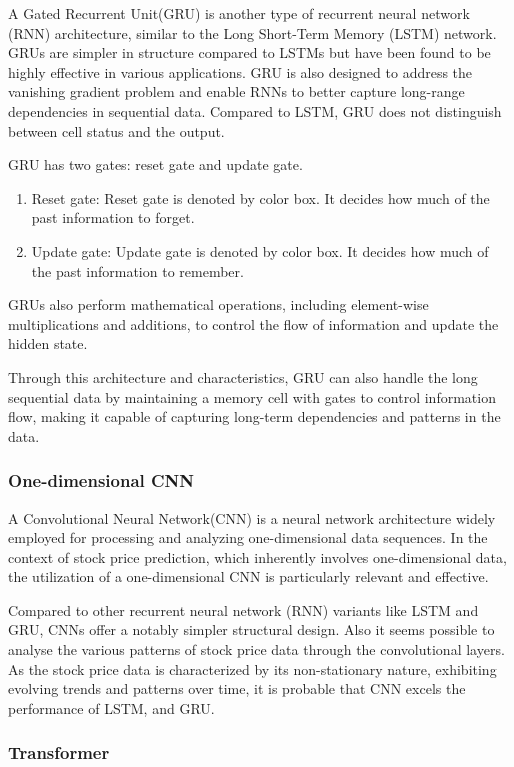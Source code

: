 A Gated Recurrent Unit(GRU) is another type of recurrent neural network (RNN) architecture, 
similar to the Long Short-Term Memory (LSTM) network. 
GRUs are simpler in structure compared to LSTMs but have been found to be highly effective in various applications. 
GRU is also designed to address the vanishing gradient problem and enable RNNs to better capture long-range dependencies in sequential data. 
Compared to LSTM, GRU does not distinguish between cell status and the output.

GRU has two gates: reset gate and update gate.
\begin{enumerate}
	\item Reset gate: Reset gate is denoted by color box. It decides how much of the past information to forget.
	\item Update gate: Update gate is denoted by color box. It decides how much of the past information to remember.
\end{enumerate}

GRUs also perform mathematical operations, including element-wise multiplications and additions, to control the flow of information and update the hidden state.

Through this architecture and characteristics, GRU can also handle the long sequential data by maintaining a memory cell with gates to control information flow, 
making it capable of capturing long-term dependencies and patterns in the data.


\subsubsection{One-dimensional CNN}

A Convolutional Neural Network(CNN) is a neural network architecture widely employed for processing and analyzing one-dimensional data sequences. 
In the context of stock price prediction, which inherently involves one-dimensional data, the utilization of a one-dimensional CNN is particularly relevant and effective.

Compared to other recurrent neural network (RNN) variants like LSTM and GRU, CNNs offer a notably simpler structural design. 
Also it seems possible to analyse the various patterns of stock price data through the convolutional layers.
As the stock price data is characterized by its non-stationary nature, exhibiting evolving trends and patterns over time, 
it is probable that CNN excels the performance of LSTM, and GRU.

\subsubsection{Transformer}

